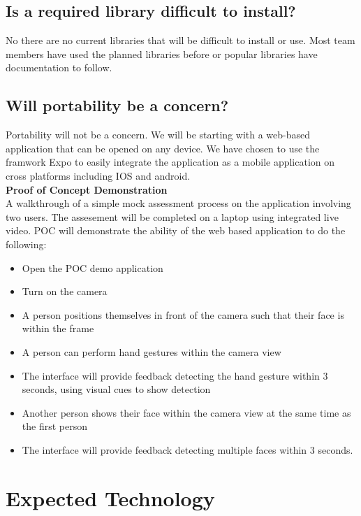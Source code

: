 \documentclass{article}
\begin{document}
\subsection{Is a required library difficult to install?}
No there are no current libraries that will be difficult to install or use. Most
team members have used the planned libraries before or popular libraries have documentation to
follow.\\

\pagebreak

\subsection{Will portability be a concern?}
Portability will not be a concern. We will be starting with a web-based application that can be opened on any device. We have chosen to use the framwork Expo to easily integrate the application as a mobile application on cross platforms including IOS and android.\\


\textbf{Proof of Concept Demonstration}\\

A walkthrough of a simple mock assessment process on the application involving two users. The assesement will be completed on a laptop using integrated live video. POC will demonstrate the ability of the web based application to do the following: \\
\begin{itemize}
  \item Open the POC demo application
  \item Turn on the camera
  \item A person positions themselves in front of the camera such that their face is within the frame
  \item A person can perform hand gestures within the camera view
  \item The interface will provide feedback detecting the hand gesture within 3 seconds, using visual cues to show detection
  \item Another person shows their face within the camera view at the same time as the first person
  \item The interface will provide feedback detecting multiple faces within 3 seconds.
\end{itemize}

\section{Expected Technology}
\end{document}
